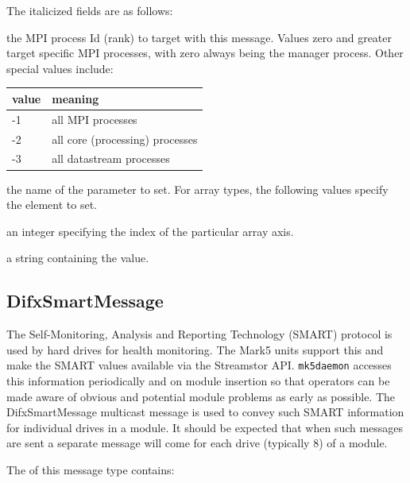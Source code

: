 \begin{description}
\noindent The italicized fields are as follows:

\begin{description}
\item{} the MPI process Id (rank) to target with this message.
Values zero and greater target specific MPI processes, with zero always being the manager process.
Other special values include:

\begin{tabular}{ll}
value & meaning \\
\hline
-1 & all MPI processes \\
-2 & all core (processing) processes \\
-3 & all datastream processes \\
\end{tabular}

\item{} the name of the parameter to set.
For array types, the following  values specify the element to set.
\item{} an integer specifying the index of the particular array axis.
\item{} a string containing the value.

\end{description}







\subsection{DifxSmartMessage}

The Self-Monitoring, Analysis and Reporting Technology (SMART) protocol is used by hard drives for health monitoring.
The Mark5 units support this and make the SMART values available via the Streamstor API.
{\tt mk5daemon} accesses this information periodically and on module insertion so that operators can be made aware of obvious and potential module problems as early as possible.
The DifxSmartMessage multicast message is used to convey such SMART information for individual drives in a module.
It should be expected that when such messages are sent a separate message will come for each drive (typically 8) of a module.


The  of this message type contains:


\end{description}
